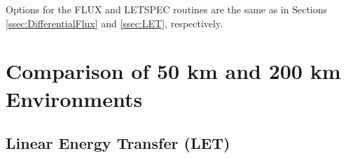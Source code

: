 \documentclass{hitec}
\begin{document}
Options for the \textsf{FLUX} and \textsf{LETSPEC} routines are the same as in Sections \ref{ssec:DifferentialFlux} and \ref{ssec:LET}, respectively.
\newpage

\section{Comparison of 50 km and 200 km Environments}\label{sec:ComparisonOf50kmAnd200kmEnvironments}

\subsection{Linear Energy Transfer (LET)}

\end{document}
